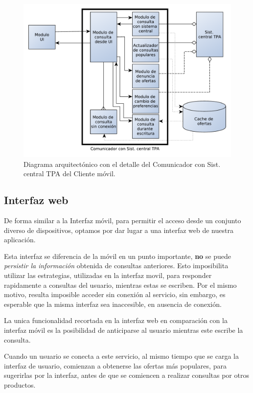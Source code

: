 \begin{figure}[H]
	\centering
	\includegraphics[width=\textwidth]{graficos/arch/cliente_movil_comunicador.pdf}
	\caption{Diagrama arquitectónico con el detalle del \textsf{Comunicador con Sist. central TPA} del \textsf{Cliente móvil}.}
\end{figure}

\subsection{Interfaz web}

De forma similar a la Interfaz móvil, para permitir el acceso desde un conjunto diverso de dispositivos, optamos por dar lugar a una interfaz web de nuestra aplicación.

Esta interfaz se diferencia de la móvil en un punto importante, \textbf{no} se puede \emph{persistir la información} obtenida de consultas anteriores. Esto imposibilita utilizar las estrategias, utilizadas en la interfaz movil, para responder rapidamente a consultas del usuario, mientras estas se escriben. Por el mismo motivo, resulta imposible acceder sin conexión al servicio, sin embargo, es esperable que la misma interfaz sea inaccesible, en ausencia de conexión.

La unica funcionalidad recortada en la interfaz web en comparación con la interfaz móvil es la posibilidad de anticiparse al usuario mientras este escribe la consulta.

Cuando un usuario se conecta a este servicio, al mismo tiempo que se carga la interfaz de usuario, comienzan a obtenerse las ofertas más populares, para sugerirlas por la interfaz, antes de que se comiencen a realizar consultas por otros productos.

